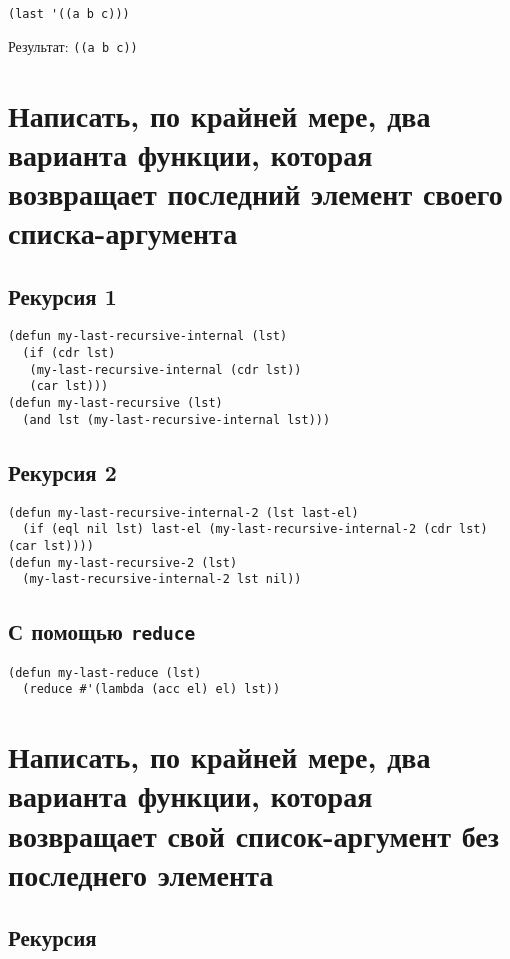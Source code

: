 \begin{lstlisting}
(last '((a b c)))
\end{lstlisting}
Результат: \texttt{((a b c))}


\section{Написать, по крайней мере, два варианта функции, которая возвращает последний элемент своего списка-аргумента}

\subsection{Рекурсия 1}

\begin{lstlisting}
(defun my-last-recursive-internal (lst)
  (if (cdr lst) 
   (my-last-recursive-internal (cdr lst))
   (car lst)))
(defun my-last-recursive (lst)
  (and lst (my-last-recursive-internal lst)))
\end{lstlisting}

\subsection{Рекурсия 2}

\begin{lstlisting}
(defun my-last-recursive-internal-2 (lst last-el)
  (if (eql nil lst) last-el (my-last-recursive-internal-2 (cdr lst) (car lst))))
(defun my-last-recursive-2 (lst)
  (my-last-recursive-internal-2 lst nil))
\end{lstlisting}

\subsection{С помощью \texttt{reduce}}

\begin{lstlisting}
(defun my-last-reduce (lst)
  (reduce #'(lambda (acc el) el) lst))
\end{lstlisting}

\section{Написать, по крайней мере, два варианта функции, которая возвращает свой список-аргумент без последнего элемента}

\subsection{Рекурсия}

